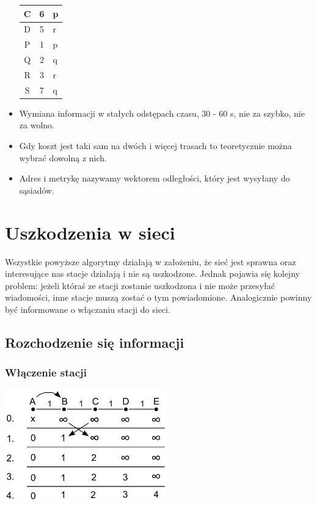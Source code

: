 \documentclass[a4paper,twoside]{article}
\begin{document}
\begin{itemize}
\begin{table}[h]
\begin{tabular}{|c|c|l|}
							C     & 6       & p                     \\ \hline
							D     & 5       & r                     \\ \hline
							P     & 1       & p                     \\ \hline
							Q     & 2       & q                     \\ \hline
							R     & 3       & r                     \\ \hline
							S     & 7       & q                     \\ \hline
						\end{tabular}
					\end{table}
					\item Wymiana informacji w stałych odstępach czasu, 30 - 60 s, nie za szybko, nie za wolno.
					\item Gdy koszt jest taki sam na dwóch i więcej trasach to teoretycznie można wybrać dowolną z nich.
					\item Adres i metrykę nazywamy wektorem odległości, który jest wysyłany do sąsiadów.
				\end{itemize}
	\section{Uszkodzenia w sieci}
		Wszystkie powyższe algorytmy działają w założeniu, że sieć jest sprawna oraz interesujące nas stacje działają i nie są uszkodzone. Jednak pojawia się kolejny problem: jeżeli któraś ze stacji zostanie uszkodzona i nie może przesyłać wiadomości, inne stacje muszą zostać o tym powiadomione. Analogicznie powinny być informowane o włączaniu stacji do sieci.
		\subsection{Rozchodzenie się informacji}
			\subsubsection{Włączenie stacji}
				\includegraphics[width=7.0cm]{./images/image42.pdf}
\end{document}
